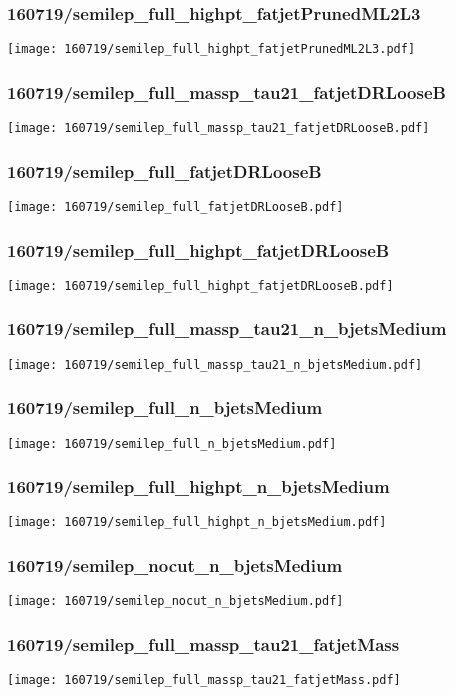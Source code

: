 \begin{frame}
   \frametitle{\small 160719/semilep\_full\_highpt\_fatjetPrunedML2L3}
   \centering
   \texttt{[image: 160719/semilep\_full\_highpt\_fatjetPrunedML2L3.pdf]}
\end{frame}

\begin{frame}
   \frametitle{\small 160719/semilep\_full\_massp\_tau21\_fatjetDRLooseB}
   \centering
   \texttt{[image: 160719/semilep\_full\_massp\_tau21\_fatjetDRLooseB.pdf]}
\end{frame}

\begin{frame}
   \frametitle{\small 160719/semilep\_full\_fatjetDRLooseB}
   \centering
   \texttt{[image: 160719/semilep\_full\_fatjetDRLooseB.pdf]}
\end{frame}

\begin{frame}
   \frametitle{\small 160719/semilep\_full\_highpt\_fatjetDRLooseB}
   \centering
   \texttt{[image: 160719/semilep\_full\_highpt\_fatjetDRLooseB.pdf]}
\end{frame}

\begin{frame}
   \frametitle{\small 160719/semilep\_full\_massp\_tau21\_n\_bjetsMedium}
   \centering
   \texttt{[image: 160719/semilep\_full\_massp\_tau21\_n\_bjetsMedium.pdf]}
\end{frame}

\begin{frame}
   \frametitle{\small 160719/semilep\_full\_n\_bjetsMedium}
   \centering
   \texttt{[image: 160719/semilep\_full\_n\_bjetsMedium.pdf]}
\end{frame}

\begin{frame}
   \frametitle{\small 160719/semilep\_full\_highpt\_n\_bjetsMedium}
   \centering
   \texttt{[image: 160719/semilep\_full\_highpt\_n\_bjetsMedium.pdf]}
\end{frame}

\begin{frame}
   \frametitle{\small 160719/semilep\_nocut\_n\_bjetsMedium}
   \centering
   \texttt{[image: 160719/semilep\_nocut\_n\_bjetsMedium.pdf]}
\end{frame}

\begin{frame}
   \frametitle{\small 160719/semilep\_full\_massp\_tau21\_fatjetMass}
   \centering
   \texttt{[image: 160719/semilep\_full\_massp\_tau21\_fatjetMass.pdf]}
\end{frame}

